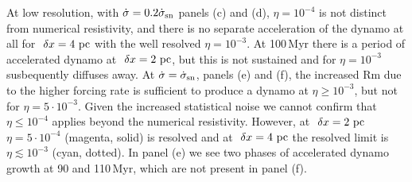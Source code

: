 \documentclass[preprint2]{aastex63}
\newcommand\SNr{\dot\sigma_{\rm sn}}
\newcommand\pc{~ {\rm pc}}
\newcommand\dx{~ {\delta x}}
\begin{document}
At low resolution, with $\dot\sigma=0.2\SNr$ panels (c) and (d), $\eta=10^{-4}$
is not distinct from numerical resistivity, and there is no separate
acceleration of the dynamo at all for $\dx=4\pc$ with the well resolved $\eta=10^{-3}$.
At 100\,Myr there is a period of accelerated dynamo at $\dx=2\pc$, but this is
not sustained and for $\eta=10^{-3}$ susbequently diffuses away.
At $\dot\sigma=\SNr$, panels (e) and (f), the increased Rm due to the 
higher forcing rate is sufficient to produce a dynamo at $\eta\geq10^{-3}$, but
not for $\eta=5\cdot10^{-3}$.
Given the increased statistical noise we cannot confirm that $\eta\leq10^{-4}$
applies beyond the numerical resistivity.
However, at $\dx=2\pc$ $\eta=5\cdot10^{-4}$ (magenta, solid) is resolved and at $\dx=4\pc$
 the resolved limit is $\eta\lesssim10^{-3}$ (cyan, dotted).
In panel (e) we see two phases of accelerated dynamo growth at 90  and
110\,Myr, which are not  present in panel (f).
%
\end{document}
